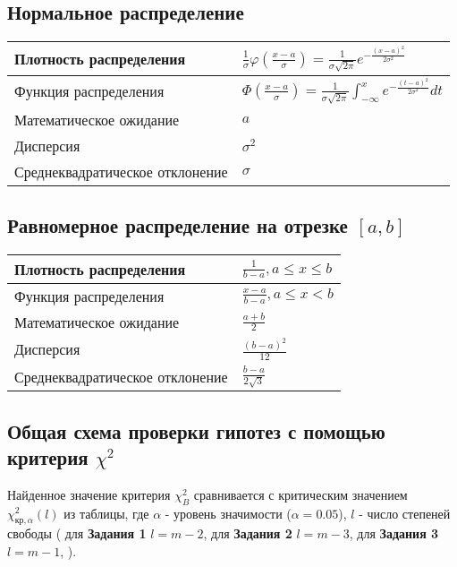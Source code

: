 \subsection{Нормальное распределение}

    \begin{tabular}{|l|l|}
    \hline
    Плотность распределения& $\frac{1}{\sigma}\varphi(\frac{x-a}{\sigma}) = \frac{1}{\sigma\sqrt{2\pi}}e^{-\frac{(x-a)^2}{2\sigma^2}}$\\
    \hline
    Функция распределения& $\Phi(\frac{x-a}{\sigma}) = \frac{1}{\sigma\sqrt{2\pi}} \int_{-\infty}^{x}e^{-\frac{(t-a)^2}{2\sigma^2}}dt$\\
    \hline
    Математическое ожидание&  $a$\\
    \hline
    Дисперсия&  $\sigma^2$\\
    \hline
    Среднеквадратическое отклонение&  $\sigma$\\
    \hline
    \end{tabular}


\subsection{Равномерное распределение на отрезке $[a, b]$}
    \begin{tabular}{|l|l|}
    \hline
    Плотность распределения& $\frac{1}{b-a}, a \leq x \leq b$\\
    \hline
    Функция распределения& $\frac{x-a}{b-a}, a \leq x < b$\\
    \hline
    Математическое ожидание&  $\frac{a+b}{2}$\\
    \hline
    Дисперсия&  $\frac{(b-a)^2}{12}$\\
    \hline
    Среднеквадратическое отклонение&  $\frac{b-a}{2\sqrt{3}}$\\
    \hline
    \end{tabular}


\subsection{Общая схема проверки гипотез с помощью критерия $\chi^2$}

Найденное значение критерия $\chi^2_B$ сравнивается с критическим значением 
$\chi^2_{\text{кр}, \alpha}(l)$ из таблицы, где $\alpha$ - уровень значимости 
($\alpha = 0.05$), $l$ - число степеней свободы (
для \textbf{Задания 1} $l = m - 2$, 
для \textbf{Задания 2} $l = m - 3$, 
для  \textbf{Задания 3} $l = m - 1$, 
).

